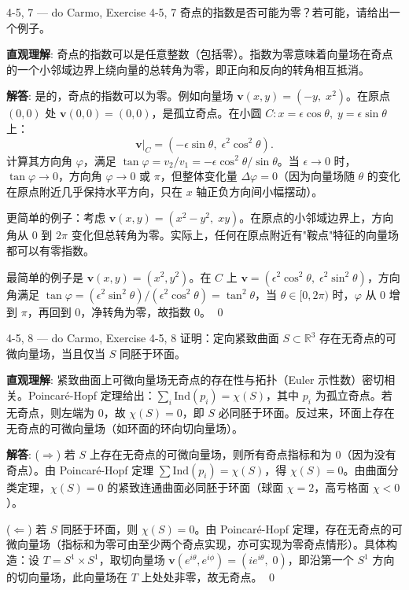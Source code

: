 \begin{exercise}{4-5, 7 — do Carmo, Exercise 4-5, 7}
奇点的指数是否可能为零？若可能，请给出一个例子。
\end{exercise}

\begin{solution}
\textbf{直观理解}: 奇点的指数可以是任意整数（包括零）。指数为零意味着向量场在奇点的一个小邻域边界上绕向量的总转角为零，即正向和反向的转角相互抵消。

\textbf{解答}: 是的，奇点的指数可以为零。例如向量场 $\mathbf{v}(x,y) = (-y,\; x^2)$。在原点 $(0,0)$ 处 $\mathbf{v}(0,0) = (0,0)$，是孤立奇点。在小圆 $C: x=\epsilon\cos\theta,\; y=\epsilon\sin\theta$ 上：
\[
\mathbf{v}|_C = (-\epsilon\sin\theta,\;\epsilon^2\cos^2\theta).
\]
计算其方向角 $\varphi$，满足 $\tan\varphi = v_2/v_1 = -\epsilon\cos^2\theta/\sin\theta$。当 $\epsilon\to 0$ 时，$\tan\varphi \to 0$，方向角 $\varphi \to 0$ 或 $\pi$，但整体变化量 $\Delta\varphi = 0$（因为向量场随 $\theta$ 的变化在原点附近几乎保持水平方向，只在 $x$ 轴正负方向间小幅摆动）。

更简单的例子：考虑 $\mathbf{v}(x,y) = (x^2-y^2,\; xy)$。在原点的小邻域边界上，方向角从 $0$ 到 $2\pi$ 变化但总转角为零。实际上，任何在原点附近有"鞍点"特征的向量场都可以有零指数。

最简单的例子是 $\mathbf{v}(x,y) = (x^2, y^2)$。在 $C$ 上 $\mathbf{v} = (\epsilon^2\cos^2\theta,\;\epsilon^2\sin^2\theta)$，方向角满足 $\tan\varphi = (\epsilon^2\sin^2\theta)/(\epsilon^2\cos^2\theta) = \tan^2\theta$，当 $\theta\in[0,2\pi)$ 时，$\varphi$ 从 $0$ 增到 $\pi$，再回到 $0$，净转角为零，故指数 $0$。
\qed
\end{solution}

\begin{exercise}{4-5, 8 — do Carmo, Exercise 4-5, 8}
证明：定向紧致曲面 $S \subset \mathbb{R}^3$ 存在无奇点的可微向量场，当且仅当 $S$ 同胚于环面。
\end{exercise}

\begin{solution}
\textbf{直观理解}: 紧致曲面上可微向量场无奇点的存在性与拓扑（Euler 示性数）密切相关。Poincaré-Hopf 定理给出：$\sum_i \mathrm{Ind}(p_i) = \chi(S)$，其中 $p_i$ 为孤立奇点。若无奇点，则左端为 $0$，故 $\chi(S)=0$，即 $S$ 必同胚于环面。反过来，环面上存在无奇点的可微向量场（如环面的环向切向量场）。

\textbf{解答}: ($\Rightarrow$) 若 $S$ 上存在无奇点的可微向量场，则所有奇点指标和为 $0$（因为没有奇点）。由 Poincaré-Hopf 定理 $\sum \mathrm{Ind}(p_i) = \chi(S)$，得 $\chi(S) = 0$。由曲面分类定理，$\chi(S)=0$ 的紧致连通曲面必同胚于环面（球面 $\chi=2$，高亏格面 $\chi<0$）。

($\Leftarrow$) 若 $S$ 同胚于环面，则 $\chi(S)=0$。由 Poincaré-Hopf 定理，存在无奇点的可微向量场（指标和为零可由至少两个奇点实现，亦可实现为零奇点情形）。具体构造：设 $T = S^1 \times S^1$，取切向量场 $\mathbf{v}(e^{i\theta}, e^{i\phi}) = (i e^{i\theta},\; 0)$，即沿第一个 $S^1$ 方向的切向量场，此向量场在 $T$ 上处处非零，故无奇点。
\qed
\end{solution}

